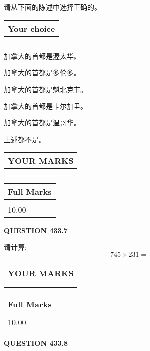 \documentclass{ctexart}
\begin{document}
  
请从下面的陈述中选择正确的。
  
  
\noindent\hspace{3.0in} \begin{tabular}{|l|}
\hline
Your choice \\
\hline
 \\ 
 \\ 
\hline
\end{tabular}
  
  
 
 
加拿大的首都是渥太华。
 
 
加拿大的首都是多伦多。
 
 
加拿大的首都是魁北克市。
 
 
加拿大的首都是卡尔加里。
 
 
加拿大的首都是温哥华。
 
 
 上述都不是。
 
 
  
\vspace{0.2in}
  
\noindent\begin{tabular}{|l|}
\hline
 YOUR MARKS  \\
\hline
 \\ 
 \\ 
\hline
\end{tabular}
\hspace{0.05in} \begin{tabular}{|l|}
\hline
 Full Marks  \\
\hline
 \\ 
10.00 \\
\hline
\end{tabular}
{\textbf{\Large{QUESTION
433.7 
}}}
  
  
 
请计算:
\begin{equation}
745  \times    %
231 = \nonumber
\end{equation}
 

 

 
  
\vspace{0.2in}
  
\noindent\begin{tabular}{|l|}
\hline
 YOUR MARKS  \\
\hline
 \\ 
 \\ 
\hline
\end{tabular}
\hspace{0.05in} \begin{tabular}{|l|}
\hline
 Full Marks  \\
\hline
 \\ 
10.00 \\
\hline
\end{tabular}
{\textbf{\Large{QUESTION
433.8 
}}}
  
\end{document}
